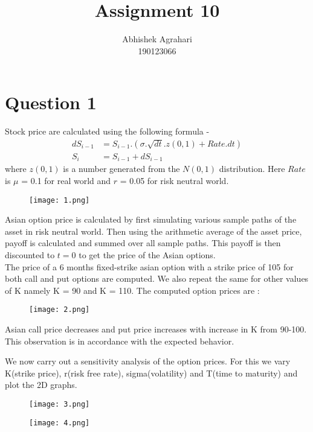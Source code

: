 \documentclass[12pt]{article}
\title{Assignment 10}
\author{Abhishek Agrahari\\190123066}
\date{}
\begin{document}
\maketitle

\section*{Question 1} 
Stock price are calculated using the following formula -
\begin{align*}
dS_{i-1} &= S_{i-1}.(\sigma. \sqrt{dt}. z(0,1) + Rate.dt)\\
S_{i} &= S_{i-1} + dS_{i-1}
\end{align*}
where $z(0,1)$ is a number generated from the $N(0,1)$ distribution. Here $Rate$ is $\mu$ = 0.1 for real world and $r$ = 0.05 for risk neutral world.

\begin{figure}[H]
\centering
\texttt{[image: 1.png]}
\end{figure}

Asian option price is calculated by first simulating various sample paths of the asset in risk neutral world. Then using the arithmetic average of the asset price, payoff is calculated and summed over all sample paths. This payoff is then discounted to $t = 0$ to get the price of the Asian options. 
\\

The price of a 6 months fixed-strike asian option with a strike price of 105 for both call and put options are computed. We also repeat the same for other values of K namely K = 90 and K = 110. The computed option prices are :
\begin{figure}[H]
\centering
\texttt{[image: 2.png]}
\end{figure}
Asian call price decreases and put price increases with increase in K from 90-100. This observation is in accordance with the expected behavior.

We now carry out a sensitivity analysis of the option prices. For this we vary K(strike price), r(risk free rate), sigma(volatility) and T(time to maturity) and plot the 2D graphs.
\begin{figure}[H]
\centering
\texttt{[image: 3.png]}
\end{figure}

\begin{figure}[H]
\centering
\texttt{[image: 4.png]}
\end{figure}
\clearpage
\end{document}
